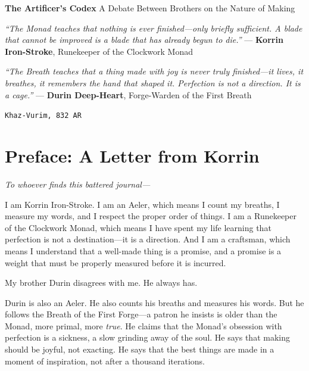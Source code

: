 \documentclass[11pt]{book}
\begin{document}


\thispagestyle{empty}
\vspace*{2cm}
\begin{center}
    {\Huge \textbf{The Artificer's Codex}}
    \vspace{0.5cm}
    {\Large A Debate Between Brothers on the Nature of Making}
    \vspace{1cm}
    
    \textit{``The Monad teaches that nothing is ever finished---only briefly sufficient. A blade that cannot be improved is a blade that has already begun to die.''}
    \vspace{0.2cm}
    --- \textbf{Korrin Iron-Stroke}, Runekeeper of the Clockwork Monad
    
    \vspace{0.5cm}
    \textit{``The Breath teaches that a thing made with joy is never truly finished---it lives, it breathes, it remembers the hand that shaped it. Perfection is not a direction. It is a cage.''}
    \vspace{0.2cm}
    --- \textbf{Durin Deep-Heart}, Forge-Warden of the First Breath
    
    \vfill
    
    \texttt{Khaz-Vurim, 832 AR}
\end{center}

\newpage
\section*{Preface: A Letter from Korrin}

\emph{To whoever finds this battered journal---}

I am Korrin Iron-Stroke. I am an Aeler, which means I count my breaths, I measure my words, and I respect the proper order of things. I am a Runekeeper of the Clockwork Monad, which means I have spent my life learning that perfection is not a destination---it is a direction. And I am a craftsman, which means I understand that a well-made thing is a promise, and a promise is a weight that must be properly measured before it is incurred.

My brother Durin disagrees with me. He always has.

Durin is also an Aeler. He also counts his breaths and measures his words. But he follows the Breath of the First Forge---a patron he insists is older than the Monad, more primal, more \textit{true}. He claims that the Monad's obsession with perfection is a sickness, a slow grinding away of the soul. He says that making should be joyful, not exacting. He says that the best things are made in a moment of inspiration, not after a thousand iterations.
\end{document}
